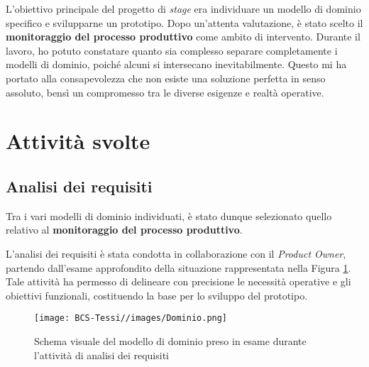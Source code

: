     \vspace{0.2 em}
    \noindent L’obiettivo principale del progetto di \textit{stage} era individuare un modello di dominio specifico e svilupparne un prototipo. Dopo un’attenta valutazione, è stato scelto il \textbf{monitoraggio del processo produttivo} come ambito di intervento. Durante il lavoro, ho potuto constatare quanto sia complesso separare completamente i modelli di dominio, poiché alcuni si intersecano inevitabilmente. Questo mi ha portato alla consapevolezza che non esiste una soluzione perfetta in senso assoluto, bensì un compromesso tra le diverse esigenze e realtà operative. 
    
    
    \section{Attività svolte}
        \subsection{Analisi dei requisiti}
        Tra i vari modelli di dominio individuati, è stato dunque selezionato quello relativo al \textbf{monitoraggio del processo produttivo}.

        \vspace{0.2 em}
        \noindent L’analisi dei requisiti è stata condotta in collaborazione con il \textit{Product Owner}, partendo dall’esame approfondito della situazione rappresentata nella Figura \ref{fig:Dominio}. Tale attività ha permesso di delineare con precisione le necessità operative e gli obiettivi funzionali, costituendo la base per lo sviluppo del prototipo.

        \begin{figure}[H]
            \centering
            \texttt{[image: BCS-Tessi//images/Dominio.png]}
            \caption[Modello di dominio preso in esame]{Schema visuale del modello di dominio preso in esame durante l'attività di analisi dei requisiti}
            \label{fig:Dominio}
        \end{figure}

